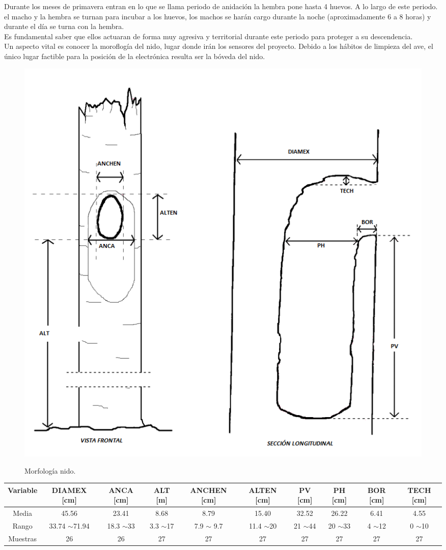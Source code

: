 Durante los meses de primavera entran en lo que se llama periodo de anidación la hembra pone hasta 4 huevos. A lo largo de este periodo. el macho y la hembra se turnan para incubar a los huevos, los machos se harán cargo durante la noche (aproximadamente 6 a 8 horas) y durante el día se turna con la hembra. \\
Es fundamental saber que ellos actuaran de forma muy agresiva y territorial durante este periodo para proteger a su descendencia. \\
Un aspecto vital es conocer la moroflogía del nido, lugar donde irán los sensores del proyecto.
Debido a los hábitos de limpieza del ave, el único lugar factible para la posición de la electrónica resulta ser la bóveda del nido. 
\begin{figure}[H]
	\centering
	\includegraphics[width=0.5\linewidth]{ImagenesIntroduccion/morfologia_nido}
	\label{fig:morfología_nido}
	\caption{Morfología nido.}
\end{figure}
\begin{table}[H]
\centering
\begin{tabular}{|c|c|c|c|c|c|c|c|c|c|}
\hline
Variable & DIAMEX {[}cm{]}   & ANCA {[}cm{]} & ALT {[}m{]}  & ANCHEN {[}cm{]} & ALTEN {[}cm{]} & PV {[}cm{]} & PH {[}cm{]} & BOR {[}cm{]} & TECH {[}cm{]} \\ \hline
Media    & 45.56             & 23.41         & 8.68         & 8.79            & 15.40          & 32.52       & 26.22       & 6.41         & 4.55          \\ \hline
Rango    & 33.74 $\sim$71.94 & 18.3 $\sim$33 & 3.3 $\sim$17 & 7.9 $\sim$ 9.7  & 11.4 $\sim$20  & 21 $\sim$44 & 20 $\sim$33 & 4 $\sim$12   & 0 $\sim$10    \\ \hline
Muestras & 26                & 26            & 27           & 27              & 27             & 27          & 27          & 27           & 27            \\ \hline
\end{tabular}
\end{table}




